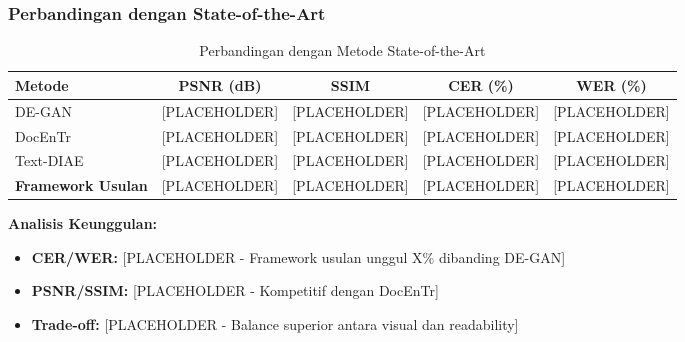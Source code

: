 \documentclass{article}
\begin{document}
\subsubsection{Perbandingan dengan State-of-the-Art}

\begin{table}[H]
\centering
\caption{Perbandingan dengan Metode State-of-the-Art}
\label{tab:sota-comparison}
\small
\begin{tabular}{lcccc}
\toprule
\textbf{Metode} & \textbf{PSNR (dB)} & \textbf{SSIM} & \textbf{CER (\%)} & \textbf{WER (\%)} \\
\midrule
DE-GAN \cite{souibgui2020degan} & [PLACEHOLDER] & [PLACEHOLDER] & [PLACEHOLDER] & [PLACEHOLDER] \\
DocEnTr \cite{zhao2020docentr} & [PLACEHOLDER] & [PLACEHOLDER] & [PLACEHOLDER] & [PLACEHOLDER] \\
Text-DIAE \cite{kang2021textdiae} & [PLACEHOLDER] & [PLACEHOLDER] & [PLACEHOLDER] & [PLACEHOLDER] \\
\midrule
\textbf{Framework Usulan} & [PLACEHOLDER] & [PLACEHOLDER] & [PLACEHOLDER] & [PLACEHOLDER] \\
\bottomrule
\end{tabular}
\end{table}

\textbf{Analisis Keunggulan:}
\begin{itemize}
    \item \textbf{CER/WER:} [PLACEHOLDER - Framework usulan unggul X\% dibanding DE-GAN]
    \item \textbf{PSNR/SSIM:} [PLACEHOLDER - Kompetitif dengan DocEnTr]
    \item \textbf{Trade-off:} [PLACEHOLDER - Balance superior antara visual dan readability]
\end{itemize}
\end{document}
